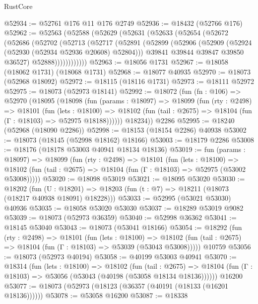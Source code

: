 \begin{lexlean}{RustCore}
\begin{coremodule}
@52934 := @52761 @176 @11 @176 @2749
@52936 := @18432 (@52766 @176)
@52962 := @52563
    (@52588
      (@52629
        (@52631
          (@52633
            (@52654
              (@52672
                (@52686
                  (@52702
                    (@52713
                      (@52717
                        (@52891
                          (@52899
                            (@52906
                              (@52909 (@52924 (@52930 (@52934 @52936 @20608) @52804)))
                              @39841
                              @39844
                              @39847
                              @39850
                              @36527)
                            @52888))))))))))))
@52963 := @18056 @1731
@52967 := @18058 (@18062 @1731) (@18068 @1731)
@52968 := @18077 @40935
@52970 := @18073 (@52968 @18092)
@52972 := @18115 (@18116 @1731)
@52973 := @18111 @52972
@52975 := @18073 (@52973 @18141)
@52992 := @18072
    (fun (fn : @106) =>
    @52970
      (@18095
        (@18098
          (fun (params : @18097) =>
          @18099
            (fun (rty : @2498) =>
            @18101
              (fun (lets : @18100) =>
              @18102 (fun (tail : @2675) => @18104 (fun (Γ : @18103) => @52975 @18188))))))
        @18234))
    @2286
@52995 := @18240 (@52968 (@18090 @2286))
@52998 := @18153 (@18154 @2286) @40938
@53002 := @18073 (@18145 (@52998 @18162) @18166)
@53003 := @18179 @2286
@53008 := @18176 (@18178 @53003 @40941 @18134 @18136)
@53019 := fun (params : @18097) =>
  @18099
    (fun (rty : @2498) =>
    @18101
      (fun (lets : @18100) =>
      @18102 (fun (tail : @2675) => @18104 (fun (Γ : @18103) => @52975 (@53002 @53008)))))
@53020 := @18098 @53019
@53021 := @18095 @53020
@53030 := @18202
    (fun (U : @18201) => @18203 (fun (t : @7) => @18211 (@18073 (@18217 @40938 @18091) @18228)))
@53033 := @52995 (@53021 @53030) @40936
@53035 := @18058 @53020 @53030
@53037 := @18289 @53019 @9082
@53039 := @18073 (@52973 @36359)
@53040 := @52998 @36362
@53041 := @18145 @53040
@53043 := @18073 (@53041 @18166)
@53054 := @18292
    (fun (rty : @2498) =>
    @18101
      (fun (lets : @18100) =>
      @18102 (fun (tail : @2675) => @18104 (fun (Γ : @18103) => @53039 (@53043 @53008)))))
    @10759
@53056 := @18073 (@52973 @40194)
@53058 := @40199 @53003 @40941
@53070 := @18314
    (fun (lets : @18100) =>
    @18102
      (fun (tail : @2675) =>
      @18104 (fun (Γ : @18103) => @53056 (@53043 (@40198 (@53058 @18134 @18136))))))
    @16200
@53077 := @18073 (@52973 (@18123 (@36357 (@40191 (@18133 (@16201 @18136))))))
@53078 := @53058 @16200
@53087 := @18338

\end{coremodule}
\end{lexlean}
